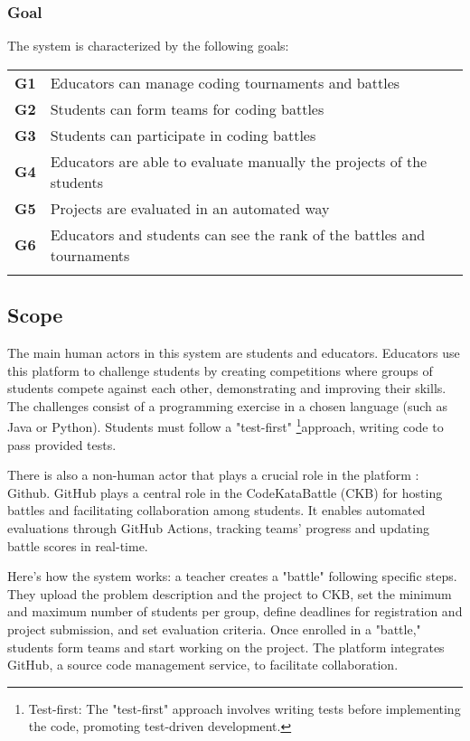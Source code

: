\subsubsection{Goal}
The system is characterized by the following goals:
\begin{table}[H]
    \begin{tabularx}{\textwidth}{cX}
        \toprule
        \textbf{G1} & Educators can manage coding tournaments and battles              \\
        \textbf{G2} & Students can form teams for coding battles  \\
        \textbf{G3} & Students can participate in coding battles    \\
        \textbf{G4} & Educators are able to evaluate manually the projects of the students\\
        \textbf{G5} & Projects are  evaluated in an automated way\\
        \textbf{G6} & Educators and students can see the rank of the battles and tournaments \\
        \\ \bottomrule
    \end{tabularx}
\end{table}


\subsection{Scope}
The main human actors in this system are students and educators. Educators use this platform to challenge students by creating competitions where groups of students compete against each other, demonstrating and improving their skills. The challenges consist of a programming exercise in a chosen language (such as Java or Python). Students must follow a "test-first" \footnote{Test-first: The "test-first" approach involves writing tests before implementing the code, promoting test-driven development.}approach, writing code to pass provided tests.

\noindent There is also a non-human actor that plays a crucial role in the platform : Github. GitHub plays a central role in the CodeKataBattle (CKB) for hosting battles and facilitating collaboration among students. It enables automated evaluations through GitHub Actions, tracking teams' progress and updating battle scores in real-time. 

\noindent Here's how the system works: a teacher creates a "battle" following specific steps. They upload the problem description and the project to CKB, set the minimum and maximum number of students per group, define deadlines for registration and project submission, and set evaluation criteria. Once enrolled in a "battle," students form teams and start working on the project. The platform integrates GitHub, a source code management service, to facilitate collaboration.

